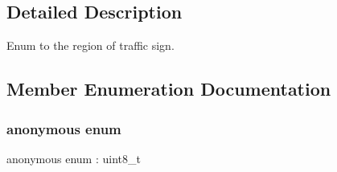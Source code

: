 \subsection{Detailed Description}
Enum to the region of traffic sign. 

\subsection{Member Enumeration Documentation}
\mbox{\label{structmaf__perception__interface_1_1TrafficSignRegionEnum_af409622a5776cb532f3500c8f91d8b4d}} 
\subsubsection{\texorpdfstring{anonymous enum}{anonymous enum}}
{\footnotesize\ttfamily anonymous enum \+: uint8\+\_\+t}


